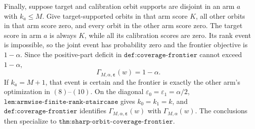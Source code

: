 Finally, suppose target and calibration orbit supports are disjoint in an arm \(a\) with \(k_a\le M\). Give target-supported orbits in that arm score \(K\), all other orbits in that arm score zero, and every orbit in the other arm score zero. The target score in arm \(a\) is always \(K\), while all its calibration scores are zero. Its rank event is impossible, so the joint event has probability zero and the frontier objective is \(1-\alpha\). Since the positive-part deficit in \(\texttt{def:coverage-frontier}\) cannot exceed \(1-\alpha\),
\[
\Gamma_{M,\alpha,\boldsymbol\varepsilon}(w)=1-\alpha.
\]
If \(k_a=M+1\), that event is certain and the frontier is exactly the other arm's optimization in \((8)\)--\((10)\). On the diagonal \(\varepsilon_0=\varepsilon_1=\alpha/2\), \(\texttt{lem:armwise-finite-rank-staircase}\) gives \(k_0=k_1=k\), and \(\texttt{def:coverage-frontier}\) identifies \(\Gamma_{M,\alpha,\boldsymbol\varepsilon}(w)\) with \(\Gamma_{M,\alpha}(w)\). The conclusions then specialize to \(\texttt{thm:sharp-orbit-coverage-frontier}\).